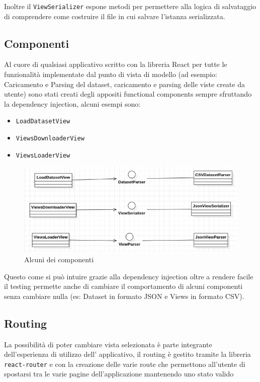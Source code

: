 Inoltre il \texttt{ViewSerializer} espone metodi per permettere alla logica di salvataggio
di comprendere come costruire il file in cui salvare l'istanza serializzata.

\subsection{Componenti}
Al cuore di qualsiasi applicativo scritto con la libreria React per tutte le
funzionalità implementate dal punto di vista di modello (ad esempio: Caricamento e Parsing
del dataset, caricamento e parsing delle viste create da utente) sono stati creati degli
appositi functional components sempre sfruttando la dependency injection, alcuni esempi sono:
\begin{itemize}
  \item \texttt{LoadDatasetView}
  \item \texttt{ViewsDownloaderView}
  \item \texttt{ViewsLoaderView}
\end{itemize}

\begin{figure}[h!]
  \centering
  \includegraphics[scale=0.55]{../../assets/classi_uml/components.png}
  \caption{Alcuni dei componenti}
\end{figure}

Questo come si può intuire grazie alla dependency injection oltre a rendere
facile il testing permette anche di cambiare il comportamento di alcuni componenti
senza cambiare nulla (es: Dataset in formato JSON e Views in formato CSV).

\subsection{Routing}
La possibilità di poter cambiare vista selezionata è parte integrante dell'esperienza
di utilizzo dell' applicativo, il routing è gestito tramite la libreria
\texttt{react-router} e con la creazione delle varie route che permettono all'utente di
spostarsi tra le varie pagine dell'applicazione mantenendo uno stato valido

